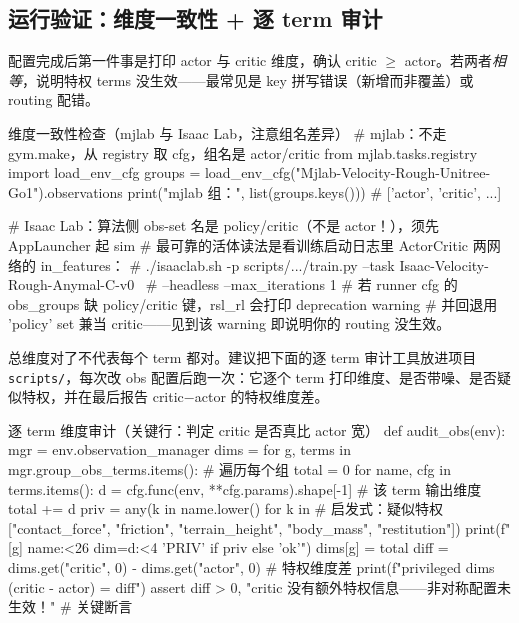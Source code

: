\subsection{运行验证：维度一致性 + 逐 term 审计}
\label{sec:rlmc-priv-verify}

配置完成后第一件事是打印 actor 与 critic 维度，确认 critic $\ge$ actor。若两者\emph{相等}，说明特权 terms 没生效——最常见是 key 拼写错误（新增而非覆盖）或 routing 配错。

\begin{codebox}[Python]{维度一致性检查（mjlab 与 Isaac Lab，注意组名差异）}
# mjlab：不走 gym.make，从 registry 取 cfg，组名是 actor/critic
from mjlab.tasks.registry import load_env_cfg
groups = load_env_cfg("Mjlab-Velocity-Rough-Unitree-Go1").observations
print("mjlab 组：", list(groups.keys()))   # ['actor', 'critic', ...]

# Isaac Lab：算法侧 obs-set 名是 policy/critic（不是 actor！），须先 AppLauncher 起 sim
# 最可靠的活体读法是看训练启动日志里 ActorCritic 两网络的 in_features：
#   ./isaaclab.sh -p scripts/.../train.py --task Isaac-Velocity-Rough-Anymal-C-v0 \
#       --headless --max_iterations 1
# 若 runner cfg 的 obs_groups 缺 policy/critic 键，rsl_rl 会打印 deprecation warning
# 并回退用 'policy' set 兼当 critic——见到该 warning 即说明你的 routing 没生效。
\end{codebox}

总维度对了不代表每个 term 都对。建议把下面的逐 term 审计工具放进项目 \verb|scripts/|，每次改 obs 配置后跑一次：它逐个 term 打印维度、是否带噪、是否疑似特权，并在最后报告 critic$-$actor 的特权维度差。

\begin{codebox}[Python]{逐 term 维度审计（关键行：判定 critic 是否真比 actor 宽）}
def audit_obs(env):
    mgr = env.observation_manager
    dims = {}
    for g, terms in mgr.group_obs_terms.items():        # 遍历每个组
        total = 0
        for name, cfg in terms.items():
            d = cfg.func(env, **cfg.params).shape[-1]    # 该 term 输出维度
            total += d
            priv = any(k in name.lower() for k in        # 启发式：疑似特权
                       ["contact_force", "friction", "terrain_height",
                        "body_mass", "restitution"])
            print(f"[{g}] {name:<26} dim={d:<4} {'PRIV' if priv else 'ok'}")
        dims[g] = total
    diff = dims.get("critic", 0) - dims.get("actor", 0)  # 特权维度差
    print(f"privileged dims (critic - actor) = {diff}")
    assert diff > 0, "critic 没有额外特权信息——非对称配置未生效！"  # 关键断言
\end{codebox}

